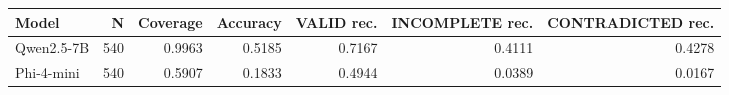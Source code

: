 \begin{tabular}{lrrrrrr}
\toprule
Model & N & Coverage & Accuracy & VALID rec. & INCOMPLETE rec. & CONTRADICTED rec. \\
\midrule
Qwen2.5-7B & 540 & 0.9963 & 0.5185 & 0.7167 & 0.4111 & 0.4278 \\
Phi-4-mini & 540 & 0.5907 & 0.1833 & 0.4944 & 0.0389 & 0.0167 \\
\bottomrule
\end{tabular}
